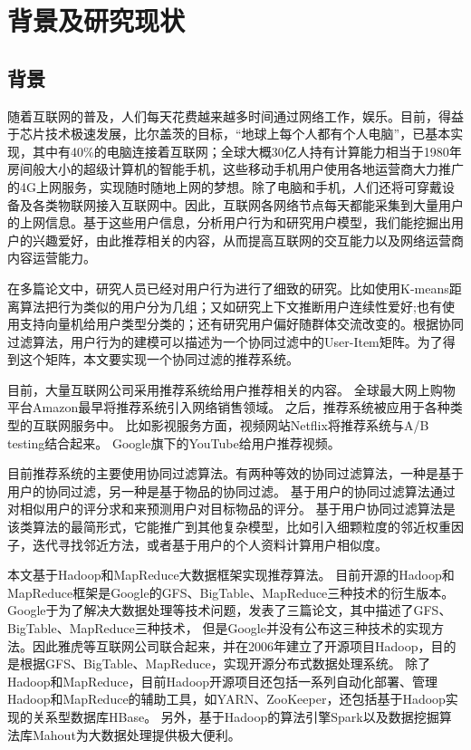 \chapter{背景及研究现状}

\section{背景}
随着互联网的普及，人们每天花费越来越多时间通过网络工作，娱乐。目前，得益于芯片技术极速发展，比尔盖茨的目标，“地球上每个人都有个人电脑”，已基本实现，其中有40\%的电脑连接着互联网；全球大概30亿人持有计算能力相当于1980年房间般大小的超级计算机的智能手机，这些移动手机用户使用各地运营商大力推广的4G上网服务，实现随时随地上网的梦想。除了电脑和手机，人们还将可穿戴设备及各类物联网接入互联网中。因此，互联网各网络节点每天都能采集到大量用户的上网信息。基于这些用户信息，分析用户行为和研究用户模型，我们能挖掘出用户的兴趣爱好，由此推荐相关的内容，从而提高互联网的交互能力以及网络运营商内容运营能力。

在多篇论文中，研究人员已经对用户行为进行了细致的研究。比如使用K-means距离算法\parencite{杨清龙2013基于网络日志的互联网用户行为分析}把行为类似的用户分为几组；又如研究上下文推断用户连续性爱好\parencite{史艳翠2013基于通信数据的上下文移动用户偏好动态获取方法研究};也有使用支持向量机给用户类型分类的\parencite{程辉2013网络用户偏好分析及话题趋势预测方法研究}；还有研究用户偏好随群体交流改变的\parencite{张欢2014网络用户偏好分析方法的研究,程辉2013网络用户偏好分析及话题趋势预测方法研究}。根据协同过滤算法\parencite{Resnick}，用户行为的建模可以描述为一个协同过滤中的User-Item矩阵。为了得到这个矩阵，本文要实现一个协同过滤的推荐系统。

目前，大量互联网公司采用推荐系统给用户推荐相关的内容。
全球最大网上购物平台Amazon最早将推荐系统引入网络销售领域\parencite{1167344}。
之后，推荐系统被应用于各种类型的互联网服务中。
比如影视服务方面，视频网站Netflix将推荐系统与A/B testing结合起来\parencite{Kondo2015The}。
Google旗下的YouTube给用户推荐视频\parencite{Davidson2010The}。

目前推荐系统的主要使用协同过滤算法。有两种等效的协同过滤算法，一种是基于用户的协同过滤，另一种是基于物品的协同过滤。
基于用户的协同过滤算法通过对相似用户的评分求和来预测用户对目标物品的评分\parencite{Resnick}。
基于用户协同过滤算法是该类算法的最简形式\parencite{adomavicius2005toward}，它能推广到其他复杂模型，比如引入细颗粒度的邻近权重因子\parencite{herlocker2000explaining}，迭代寻找邻近方法\parencite{Zhang2007A}，或者基于用户的个人资料计算用户相似度\parencite{shi2009exploiting}。

本文基于Hadoop和MapReduce大数据框架实现推荐算法。
目前开源的Hadoop和MapReduce框架是Google的GFS、BigTable、MapReduce三种技术的衍生版本。
Google于为了解决大数据处理等技术问题，发表了三篇论文，其中描述了GFS、BigTable、MapReduce三种技术\parencite{Ghemawat2004MapReduce,Ghemawat2003The,Chang2008Bigtable}，
但是Google并没有公布这三种技术的实现方法。因此雅虎等互联网公司联合起来，并在2006年建立了开源项目Hadoop，目的是根据GFS、BigTable、MapReduce，实现开源分布式数据处理系统。
除了Hadoop和MapReduce，目前Hadoop开源项目还包括一系列自动化部署、管理Hadoop和MapReduce的辅助工具，如YARN、ZooKeeper，还包括基于Hadoop实现的关系型数据库HBase。
另外，基于Hadoop的算法引擎Spark以及数据挖掘算法库Mahout为大数据处理提供极大便利。

